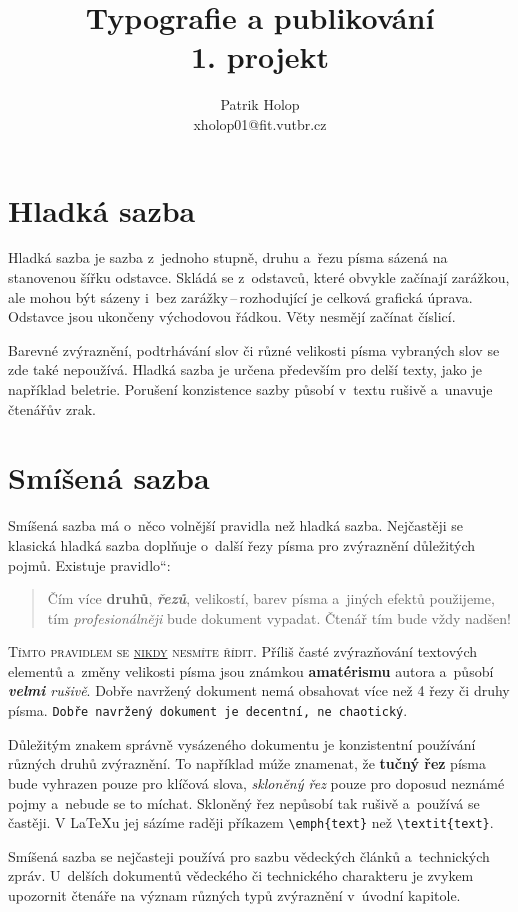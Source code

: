\documentclass[11pt,a4paper,twocolumn]{article}
\title{Typografie a publikování\\1. projekt}
\author{Patrik Holop\\xholop01@fit.vutbr.cz}
\date{}
\newcommand{\myuv}[1]{\quotedblbase #1\textquotedblleft}
\begin{document}
\maketitle

\section{Hladká sazba}
Hladká sazba je sazba z~jednoho stupně, druhu a~řezu písma sázená na stanovenou šířku odstavce. Skládá se z~odstavců, které obvykle začínají zarážkou, ale mohou být sázeny i~bez zarážky\,--\,rozhodující je celková grafická úprava. Odstavce jsou ukončeny východovou řádkou. Věty nesmějí začínat číslicí.\par
Barevné zvýraznění, podtrhávání slov či různé velikosti písma vybraných slov se zde také nepoužívá. Hladká sazba je určena především pro delší texty, jako je například beletrie. Porušení konzistence sazby působí v~textu rušivě a~unavuje čtenářův zrak.\par

\section{Smíšená sazba}
Smíšená sazba má o~něco volnější pravidla než hladká sazba. Nejčastěji se klasická hladká sazba doplňuje o~další řezy písma pro zvýraznění důležitých pojmů. Existuje \myuv{pravidlo}:

\begin{quotation}
Čím více \textbf{druhů}, \textbf{\textit{řezů}}, {\scriptsize velikostí}, barev pí\-sma a~jiných efektů použijeme, tím \textsl{profe\-sionálněji} bude dokument vypadat. Čtenář tím bude vždy {\Huge nadšen!}
\end{quotation}

\textsc{Tímto pravidlem se \underline{nikdy} nesmíte řídit}. Příliš časté zvýrazňování textových elementů a~změny velikosti {\tiny písma} jsou {\LARGE známkou} \textbf{\huge amatéris\-mu} autora a~působí \textit{\textbf{velmi} rušivě}. Dobře navrže\-ný dokument nemá obsahovat více než 4 řezy či druhy písma. \texttt{Dobře navržený dokument je decentní, ne chaotický}.\par
Důležitým znakem správně vysázeného dokumentu je konzistentní používání různých druhů zvýraznění. To například múže znamenat, že \textbf{tučný řez} písma bude vyhrazen pouze pro klíčová slova, \textit{skloněný řez} pouze pro doposud neznámé pojmy a~nebude se to míchat. Skloněný řez nepůsobí tak rušivě a~používá se častěji. V \LaTeX u jej sázíme raději příkazem \verb|\emph{text}| než \verb|\textit{text}|.\par
Smíšená sazba se nejčasteji používá pro sazbu vědeckých článků a~technických zpráv. U~delších dokumentů vědeckého či technického charakteru je zvykem upozornit čtenáře na význam různých typů zvýraznění v~úvodní kapitole.\par
\end{document}
